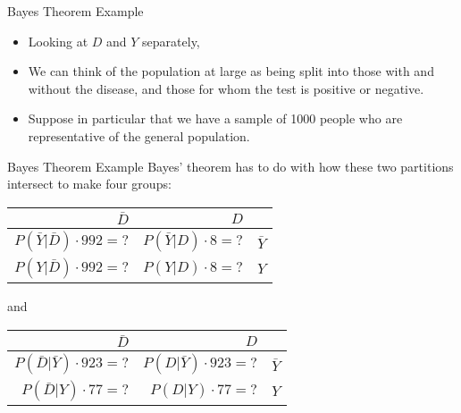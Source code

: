 \begin{frame}{Bayes Theorem  Example }

\begin{itemize}
\item   Looking at $D$ and $Y$ separately, 
\item We can think of the population at large as
being split into those with and without the disease, and those for whom the
test is positive or negative.  
\item Suppose in particular that we have a sample of
1000 people who are representative of the general population. 
\end{itemize}
\end{frame}



\begin{frame}{Bayes Theorem  Example }
Bayes' theorem has to do with how these two partitions intersect to make four
groups:
	\begin{tabular}{|r|r||c|}
	\hline $\bar{D}$ & $D$ & \\
	\hline
	\hline  $P(\bar{Y}|\bar{D}) \cdot 992 = ?$ & $P(\bar{Y}|D) \cdot 8 = ?$ & $\bar{Y}$ \\
	\hline  $P(Y    |\bar{D}) \cdot 992 = ?$ & $P(Y    |D) \cdot 8 = ?$ & $Y$ \\
	\hline
	\end{tabular}
%
	\qquad
	
	
	\textrm{and}
	
	
	\qquad
	
%
	\begin{tabular}{|r|r||c|}
	\hline $\bar{D}$ & $D$ & \\
	\hline
	\hline  $P(\bar{D}|\bar{Y}) \cdot 923 = ?$ & $P(D|\bar{Y}) \cdot 923 = ?$ & $\bar{Y}$ \\
	\hline  $P(\bar{D}|Y)     \cdot  77 = ?$ & $P(D|Y)     \cdot  77 = ?$ & $Y$ \\
	\hline
	\end{tabular}
\end{frame}




